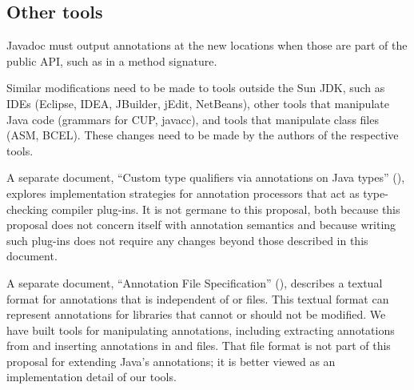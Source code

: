 \documentclass[10pt]{article}
\begin{document}
\subsection{Other tools\label{other-tools}}

Javadoc must output annotations at the new locations when those are part
of the public API, such as in a
method signature.


Similar modifications need to be made to tools outside the Sun JDK,
such as IDEs (Eclipse, IDEA, JBuilder, jEdit, NetBeans), other tools that
manipulate Java code (grammars for CUP, javacc), and tools that
manipulate class files (ASM, BCEL\@).  These changes need to be made by the
authors of the respective tools.


A separate document, ``Custom type qualifiers via annotations on Java
types'' (),
explores implementation strategies for annotation processors that act as type-checking
compiler plug-ins.  It is not germane to this proposal, both because this proposal
does not concern itself with annotation semantics and because writing such
plug-ins does not require any changes beyond those described in this document.


A separate document, ``Annotation File Specification''
(), describes a
textual format for annotations that is independent of  or
 files.  This textual format can represent annotations for
libraries that cannot or should not be modified.  We have built
tools for manipulating annotations, including extracting
annotations from and inserting annotations in  and
 files.
That file format is not part of this proposal for
extending Java's annotations; it is better viewed as an implementation
detail of our tools.
\end{document}
